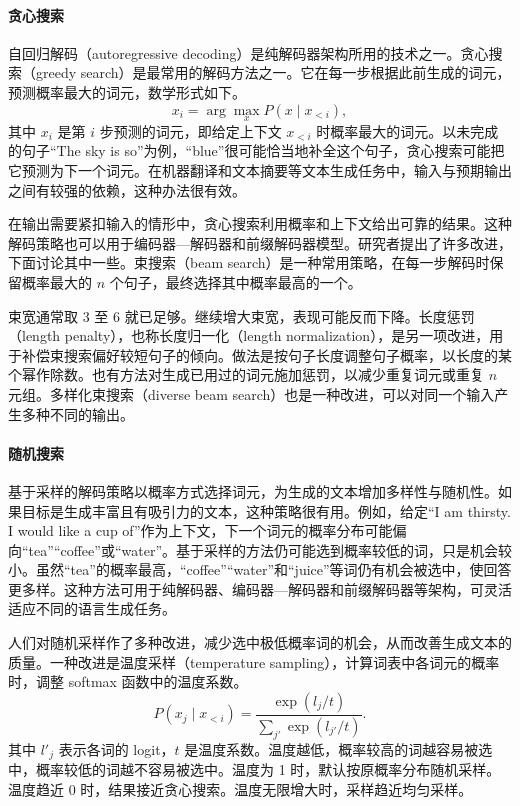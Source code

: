 \paragraph*{贪心搜索}
自回归解码（autoregressive decoding）是纯解码器架构所用的技术之一。贪心搜索（greedy search）是最常用的解码方法之一。它在每一步根据此前生成的词元，预测概率最大的词元，数学形式如下。
\[
x_i=\arg\max_x P(x\mid x_{<i}),
\]
其中 $x_i$ 是第 $i$ 步预测的词元，即给定上下文 $x_{<i}$ 时概率最大的词元。以未完成的句子“The sky is so”为例，“blue”很可能恰当地补全这个句子，贪心搜索可能把它预测为下一个词元。在机器翻译和文本摘要等文本生成任务中，输入与预期输出之间有较强的依赖，这种办法很有效。

在输出需要紧扣输入的情形中，贪心搜索利用概率和上下文给出可靠的结果。这种解码策略也可以用于编码器—解码器和前缀解码器模型。研究者提出了许多改进，下面讨论其中一些。束搜索（beam search）是一种常用策略，在每一步解码时保留概率最大的 $n$ 个句子，最终选择其中概率最高的一个。

\begin{practicaltip}
束宽通常取 3 至 6 就已足够。继续增大束宽，表现可能反而下降。长度惩罚（length penalty），也称长度归一化（length normalization），是另一项改进，用于补偿束搜索偏好较短句子的倾向。做法是按句子长度调整句子概率，以长度的某个幂作除数。也有方法对生成已用过的词元施加惩罚，以减少重复词元或重复 $n$ 元组。多样化束搜索（diverse beam search）也是一种改进，可以对同一个输入产生多种不同的输出。
\end{practicaltip}

\paragraph*{随机搜索}
基于采样的解码策略以概率方式选择词元，为生成的文本增加多样性与随机性。如果目标是生成丰富且有吸引力的文本，这种策略很有用。例如，给定“I am thirsty. I would like a cup of”作为上下文，下一个词元的概率分布可能偏向“tea”“coffee”或“water”。基于采样的方法仍可能选到概率较低的词，只是机会较小。虽然“tea”的概率最高，“coffee”“water”和“juice”等词仍有机会被选中，使回答更多样。这种方法可用于纯解码器、编码器—解码器和前缀解码器等架构，可灵活适应不同的语言生成任务。

人们对随机采样作了多种改进，减少选中极低概率词的机会，从而改善生成文本的质量。一种改进是温度采样（temperature sampling），计算词表中各词元的概率时，调整 softmax 函数中的温度系数。
\[
P(x_j\mid x_{<i})=\frac{\exp(l_j/t)}{\sum_{j'}\exp(l_{j'}/t)}.
\]
其中 $l'_j$ 表示各词的 logit，$t$ 是温度系数。温度越低，概率较高的词越容易被选中，概率较低的词越不容易被选中。温度为 1 时，默认按原概率分布随机采样。温度趋近 0 时，结果接近贪心搜索。温度无限增大时，采样趋近均匀采样。


